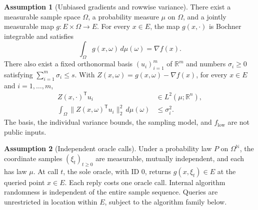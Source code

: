 \documentclass[10pt]{article}
\theoremstyle{definition}
\newtheorem{assumption}{Assumption}
\begin{document}
\begin{assumption}[Unbiased gradients and rowwise variance]
There exist a measurable sample space $\Omega$, a probability measure $\mu$ on $\Omega$, and a jointly measurable map $g:E\times\Omega\to E$. For every $x\in E$, the map $g(x,\cdot)$ is Bochner integrable and satisfies
\[
\int_{\Omega}g(x,\omega)\,d\mu(\omega)=\nabla f(x).
\]
There also exist a fixed orthonormal basis $(u_i)_{i=1}^m$ of $\mathbb{R}^m$ and numbers $\sigma_i\geq0$ satisfying $\sum_{i=1}^m\sigma_i\leq s$. With $Z(x,\omega)=g(x,\omega)-\nabla f(x)$, for every $x\in E$ and $i=1,\ldots,m$,
\[
\begin{aligned}
Z(x,\cdot)^{\mathsf T}u_i&\in L^2(\mu;\mathbb{R}^n),\\
\int_{\Omega}\|Z(x,\omega)^{\mathsf T}u_i\|_2^2\,d\mu(\omega)
&\leq\sigma_i^2.
\end{aligned}
\]
The basis, the individual variance bounds, the sampling model, and $f_{\mathrm{low}}$ are not public inputs.
\end{assumption}

\begin{assumption}[Independent oracle calls]
Under a probability law $P$ on $\Omega^{\mathbb{N}}$, the coordinate samples $(\xi_t)_{t\geq0}$ are measurable, mutually independent, and each has law $\mu$. At call $t$, the sole oracle, with ID $0$, returns $g(x,\xi_t)\in E$ at the queried point $x\in E$. Each reply costs one oracle call. Internal algorithm randomness is independent of the entire sample sequence. Queries are unrestricted in location within $E$, subject to the algorithm family below.
\end{assumption}
\end{document}
